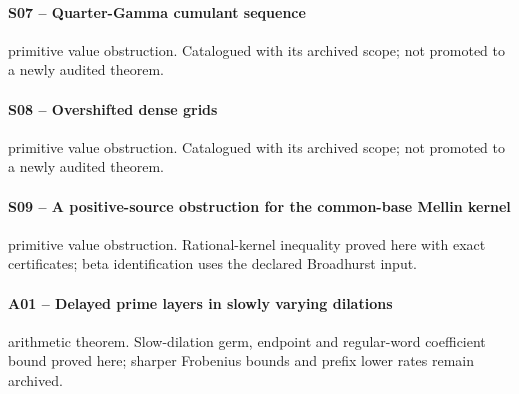 \paragraph{S07 -- Quarter-Gamma cumulant sequence}\label{record-S07}
primitive value obstruction. Catalogued with its archived scope; not promoted to a newly audited theorem.
\par\smallskip{}\par
\paragraph{S08 -- Overshifted dense grids}\label{record-S08}
primitive value obstruction. Catalogued with its archived scope; not promoted to a newly audited theorem.
\par\smallskip{}\par
\paragraph{S09 -- A positive-source obstruction for the common-base Mellin kernel}\label{record-S09}
primitive value obstruction. Rational-kernel inequality proved here with exact certificates; beta identification uses the declared Broadhurst input.
\par\smallskip{}\par
\paragraph{A01 -- Delayed prime layers in slowly varying dilations}\label{record-A01}
arithmetic theorem. Slow-dilation germ, endpoint and regular-word coefficient bound proved here; sharper Frobenius bounds and prefix lower rates remain archived.
\par\smallskip{}\par
